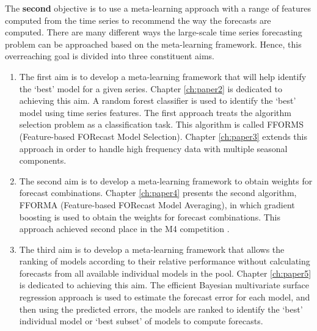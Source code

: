 \documentclass{monashthesis}
\begin{document}
The \textbf{second} objective is to use a meta-learning approach with a range of features computed from the time series to recommend the way the forecasts are computed. There are many different ways the large-scale time series forecasting problem can be approached based on the meta-learning framework. Hence, this overreaching goal is divided into three constituent aims.

\begin{enumerate}
\def\labelenumi{\arabic{enumi}.}
\item
  The first aim is to develop a meta-learning framework that will help identify the `best' model for a given series. Chapter \ref{ch:paper2} is dedicated to achieving this aim. A random forest classifier is used to identify the `best' model using time series features. The first approach treats the algorithm selection problem as a classification task. This algorithm is called FFORMS (Feature-based FORecast Model Selection). Chapter \ref{ch:paper3} extends this approach in order to handle high frequency data with multiple seasonal components.
\item
  The second aim is to develop a meta-learning framework to obtain weights for forecast combinations. Chapter \ref{ch:paper4} presents the second algorithm, FFORMA (Feature-based FORecast Model Averaging), in which gradient boosting is used to obtain the weights for forecast combinations. This approach achieved second place in the M4 competition \autocite{makridakis2018m4}.
\item
  The third aim is to develop a meta-learning framework that allows the ranking of models according to their relative performance without calculating forecasts from all available individual models in the pool. Chapter \ref{ch:paper5} is dedicated to achieving this aim. The efficient Bayesian multivariate surface regression approach is used to estimate the forecast error for each model, and then using the predicted errors, the models are ranked to identify the `best' individual model or `best subset' of models to compute forecasts.
\end{enumerate}
\end{document}
